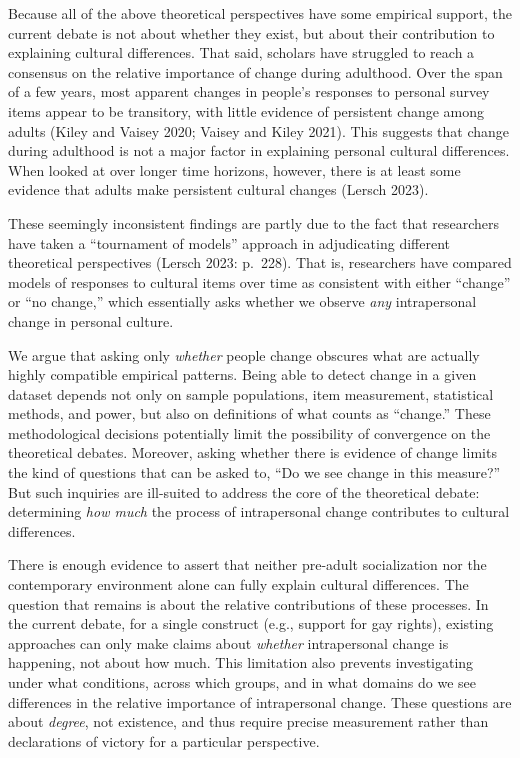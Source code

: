 \documentclass[
  12pt,
]{article}
\begin{document}
Because all of the above theoretical perspectives have some empirical
support, the current debate is not about whether they exist, but about
their contribution to explaining cultural differences. That said,
scholars have struggled to reach a consensus on the relative importance
of change during adulthood. Over the span of a few years, most apparent
changes in people's responses to personal survey items appear to be
transitory, with little evidence of persistent change among adults
(Kiley and Vaisey 2020; Vaisey and Kiley 2021). This suggests that
change during adulthood is not a major factor in explaining personal
cultural differences. When looked at over longer time horizons, however,
there is at least some evidence that adults make persistent cultural
changes (Lersch 2023).

These seemingly inconsistent findings are partly due to the fact that
researchers have taken a ``tournament of models'' approach in
adjudicating different theoretical perspectives (Lersch 2023: p.~228).
That is, researchers have compared models of responses to cultural items
over time as consistent with either ``change'' or ``no change,'' which
essentially asks whether we observe \emph{any} intrapersonal change in
personal culture.

We argue that asking only \emph{whether} people change obscures what are
actually highly compatible empirical patterns. Being able to detect
change in a given dataset depends not only on sample populations, item
measurement, statistical methods, and power, but also on definitions of
what counts as ``change.'' These methodological decisions potentially
limit the possibility of convergence on the theoretical debates.
Moreover, asking whether there is evidence of change limits the kind of
questions that can be asked to, ``Do we see change in this measure?''
But such inquiries are ill-suited to address the core of the theoretical
debate: determining \emph{how much} the process of intrapersonal change
contributes to cultural differences.

There is enough evidence to assert that neither pre-adult socialization
nor the contemporary environment alone can fully explain cultural
differences. The question that remains is about the relative
contributions of these processes. In the current debate, for a single
construct (e.g., support for gay rights), existing approaches can only
make claims about \emph{whether} intrapersonal change is happening, not
about how much. This limitation also prevents investigating under what
conditions, across which groups, and in what domains do we see
differences in the relative importance of intrapersonal change. These
questions are about \emph{degree}, not existence, and thus require
precise measurement rather than declarations of victory for a particular
perspective.
\end{document}
